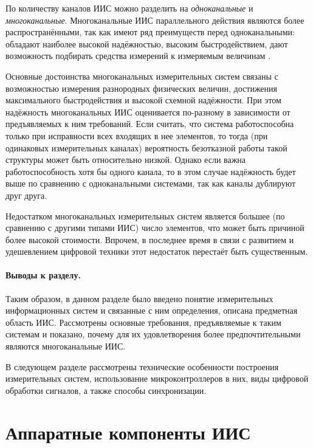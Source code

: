 \documentclass[a4paper, 14pt, titlepage]{extarticle}
\newcommand{\term}[1]{\emph{#1}}
\let\oldsection\section
\renewcommand{\section}{\newpage\oldsection}
\let\oldparagraph\paragraph
\renewcommand{\paragraph}[1]{\oldparagraph{\indent #1}}
\begin{document}
  По количеству каналов ИИС можно разделить на \term{одноканальные} и \term{многоканальные}. Многоканальные ИИС
  параллельного действия являются более распространёнными, так как имеют ряд преимуществ перед
  одноканальными: обладают наиболее высокой надёжностью, высоким быстродействием, дают возможность
  подбирать средства измерений к измеряемым величинам
  \cite[с.~171]{rannev-iis}.

  Основные достоинства многоканальных измерительных систем связаны с возможностью измерения
  разнородных физических величин, достижения
  максимального быстродействия и высокой схемной надёжности. При этом надёжность многоканальных ИИС
  оценивается по-разному в зависимости от предъявляемых к ним требований. Если считать, что система
  работоспособна только при исправности всех входящих в нее элементов, то тогда (при одинаковых
  измерительных каналах) вероятность безотказной работы такой структуры может быть относительно
  низкой. Однако если важна работоспособность хотя бы одного канала, то в этом случае надёжность
  будет выше по сравнению с одноканальными системами, так как каналы дублируют друг друга.

  Недостатком многоканальных измерительных систем является большее (по сравнению с
  другими типами ИИС) число элементов, что может быть причиной более высокой стоимости. Впрочем, в
  последнее время в связи с развитием и удешевлением цифровой техники \cite{rathore-digital} этот недостаток
  перестаёт быть существенным.



  \paragraph{Выводы к разделу.}
  Таким образом, в данном разделе было введено понятие измерительных информационных
  систем и связанные с ним определения, описана предметная область ИИС. Рассмотрены
  основные требования, предъявляемые к таким системам и показано, почему для их удовлетворения более
  предпочтительными являются многоканальные ИИС.

  В следующем разделе рассмотрены технические особенности построения измерительных систем,
  использование микроконтроллеров в них, виды цифровой обработки сигналов, а также способы
  синхронизации.

  \section{Аппаратные компоненты ИИС}\label{sec:hardware}
\end{document}
